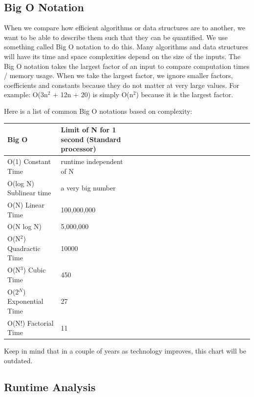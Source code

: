 \documentclass[11pt,oneside]{book}
\begin{document}
\subsection{Big O Notation}

When we compare how efficient algorithms or data structures are to another, we want to be able to describe them such that they can be quantified. We use something called Big O notation to do this. Many algorithms and data structures will have its time and space complexities depend on the size of the inputs. The Big O notation takes the largest factor of an input to compare computation times / memory usage. When we take the largest factor, we ignore smaller factors, coefficients and constants because they do not matter at very large values. For example: O(3n$^{2}$ + 12n + 20) is simply O(n$^{2}$) because it is the largest factor.

Here is a list of common Big O notations based on complexity:

\vspace{10pt} \begin{tabulary}{0.4\linewidth}{|l|l|l|l|l|l|l|l|l|l|l|l|l|l|l|l|l|l|l}\hline


  Big O &
  Limit of N for 1 second (Standard processor)\\
\hline


  O(1) Constant Time &
  runtime independent of N\\

  O(log N) Sublinear time &
  a very big number\\

  O(N) Linear Time &
  100,000,000\\

  O(N log N) &
  5,000,000\\

  O(N$^{2}$) Quadractic Time &
  10000\\

  O(N$^{3}$) Cubic Time &
  450\\

  O(2$^{N}$) Exponential Time &
  27\\

  O(N!) Factorial Time &
  11\\

\hline\end{tabulary}

Keep in mind that in a couple of years as technology improves, this chart will be outdated.

\subsection{Runtime Analysis}
\end{document}
